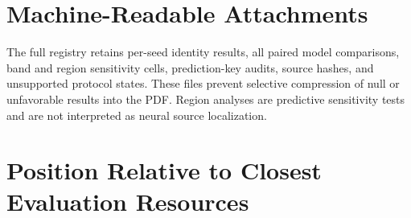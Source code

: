 \section{Machine-Readable Attachments}

The full registry retains per-seed identity results, all paired model
comparisons, band and region sensitivity cells, prediction-key audits, source
hashes, and unsupported protocol states. These files prevent selective
compression of null or unfavorable results into the PDF. Region analyses are
predictive sensitivity tests and are not interpreted as neural source
localization.

\section{Position Relative to Closest Evaluation Resources}

